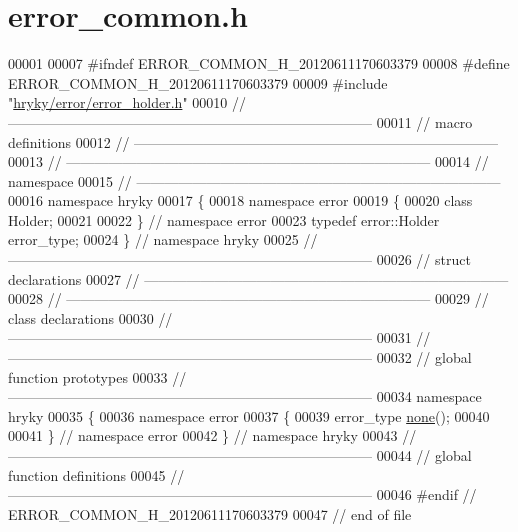 \hypertarget{error__common_8h_source}{\section{error\-\_\-common.\-h}
}

\begin{DoxyCode}
00001 
00007 \textcolor{preprocessor}{#ifndef ERROR\_COMMON\_H\_20120611170603379}
00008 \textcolor{preprocessor}{}\textcolor{preprocessor}{#define ERROR\_COMMON\_H\_20120611170603379}
00009 \textcolor{preprocessor}{}\textcolor{preprocessor}{#include "\hyperlink{error__holder_8h}{hryky/error/error_holder.h}"}
00010 \textcolor{comment}{//
      ------------------------------------------------------------------------------}
00011 \textcolor{comment}{// macro definitions}
00012 \textcolor{comment}{//
      ------------------------------------------------------------------------------}
00013 \textcolor{comment}{//
      ------------------------------------------------------------------------------}
00014 \textcolor{comment}{// namespace}
00015 \textcolor{comment}{//
      ------------------------------------------------------------------------------}
00016 \textcolor{keyword}{namespace }hryky
00017 \{
00018 \textcolor{keyword}{namespace }error
00019 \{
00020     \textcolor{keyword}{class }Holder;
00021 
00022 \} \textcolor{comment}{// namespace error}
00023 \textcolor{keyword}{typedef} error::Holder error\_type;
00024 \} \textcolor{comment}{// namespace hryky}
00025 \textcolor{comment}{//
      ------------------------------------------------------------------------------}
00026 \textcolor{comment}{// struct declarations}
00027 \textcolor{comment}{//
      ------------------------------------------------------------------------------}
00028 \textcolor{comment}{//
      ------------------------------------------------------------------------------}
00029 \textcolor{comment}{// class declarations}
00030 \textcolor{comment}{//
      ------------------------------------------------------------------------------}
00031 \textcolor{comment}{//
      ------------------------------------------------------------------------------}
00032 \textcolor{comment}{// global function prototypes}
00033 \textcolor{comment}{//
      ------------------------------------------------------------------------------}
00034 \textcolor{keyword}{namespace }hryky
00035 \{
00036 \textcolor{keyword}{namespace }error
00037 \{
00039     error\_type \hyperlink{namespacehryky_1_1error_a2297263ac1d9f9ba605bf565b6333a57}{none}();
00040 
00041 \} \textcolor{comment}{// namespace error}
00042 \} \textcolor{comment}{// namespace hryky}
00043 \textcolor{comment}{//
      ------------------------------------------------------------------------------}
00044 \textcolor{comment}{// global function definitions}
00045 \textcolor{comment}{//
      ------------------------------------------------------------------------------}
00046 \textcolor{preprocessor}{#endif // ERROR\_COMMON\_H\_20120611170603379}
00047 \textcolor{preprocessor}{}\textcolor{comment}{// end of file}
\end{DoxyCode}
